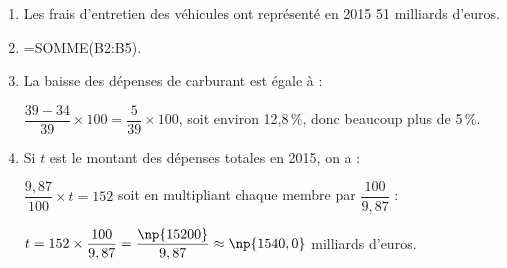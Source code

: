 
\medskip

%
%
%
%
%

\begin{enumerate}
\item %
Les frais d'entretien des véhicules ont représenté en 2015 51 milliards d'euros.
\item %
=SOMME(B2:B5).
\item %
La baisse des dépenses de carburant est égale à :

$\dfrac{39 - 34}{39} \times 100 = \dfrac{5}{39}\times 100$, soit environ 12,8\,\%, donc beaucoup plus de 5\,\%.
\item %

Si $t$ est le montant des dépenses totales en 2015, on a :

$\dfrac{9,87}{100} \times t = 152$ soit en multipliant chaque membre par $\dfrac{100}{9,87}$ :

$t = 152 \times \dfrac{100}{9,87} = \dfrac{\np{15200}}{9,87}\approx \np{1540,0}$ milliards d'euros.
\end{enumerate}

\vspace{0,5cm}

